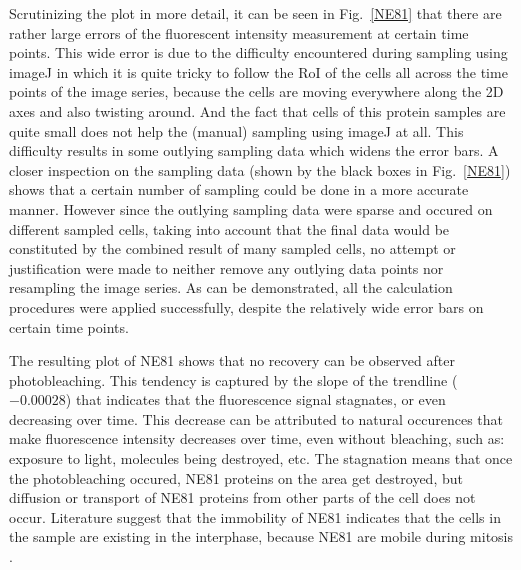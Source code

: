 Scrutinizing the plot in more detail, it can be seen in Fig.~\ref{NE81} that there are rather large errors of the fluorescent intensity measurement at certain time points. 
This wide error is due to the difficulty encountered during sampling using imageJ in which it is quite tricky to follow the RoI of the cells all across the time points of the image series, because the cells are moving everywhere along the 2D axes and also twisting around. 
And the fact that cells of this protein samples are quite small does not help the (manual) sampling using imageJ at all.
This difficulty results in some outlying sampling data which widens the error bars. 
A closer inspection on the sampling data (shown by the black boxes in Fig.~\ref{NE81}) shows that a certain number of sampling could be done in a more accurate manner. 
However since the outlying sampling data were sparse and occured on different sampled cells, taking into account that the final data would be constituted by the combined result of many sampled cells, no attempt or justification were made to neither remove any outlying data points nor resampling the image series. 
As can be demonstrated, all the calculation procedures were applied successfully, despite the relatively wide error bars on certain time points. 

The resulting plot of NE81 shows that no recovery can be observed after photobleaching. 
This tendency is captured by the slope of the trendline ($-0.00028$) that indicates that the fluorescence signal stagnates, or even decreasing over time.
 This decrease can be attributed to natural occurences that make fluorescence intensity decreases over time, even without bleaching, such as: exposure to light, molecules being destroyed, etc. 
 The stagnation means that once the photobleaching occured, NE81 proteins on the area get destroyed, but diffusion or transport of NE81 proteins from other parts of the cell does not occur. 
 Literature suggest that the immobility of NE81 indicates that the cells in the sample are existing in the interphase, because NE81 are mobile during mitosis \cite{Krueger2012}.

